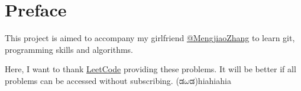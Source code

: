 \chapter{Preface}
\label{ch:preface}
This project is aimed to accompany my girlfriend \href{https://github.com/mengjiaozhang}{@MengjiaoZhang} to learn git, programming skills and algorithms.

Here, I want to thank \href{https://leetcode.com/}{LeetCode} providing these problems. It will be better if all problems can be accessed without subscribing.
(\textkannada{ಡ$\omega$ಡ})hiahiahia
